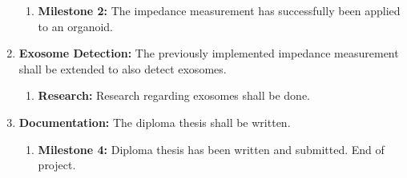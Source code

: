 \begin{enumerate}
\begin{enumerate}
        \item \textbf{Milestone 2:} The impedance measurement has successfully been applied to an organoid.
    \end{enumerate}
\item \textbf{Exosome Detection:} The previously implemented impedance measurement shall be extended to also detect exosomes.
    \begin{enumerate}
        \item \textbf{Research:} Research regarding exosomes shall be done.
    \end{enumerate}
\item \textbf{Documentation:} The diploma thesis shall be written.
    \begin{enumerate}
        \item \textbf{Milestone 4:} Diploma thesis has been written and submitted. End of project.
    \end{enumerate}
\end{enumerate}
 


 
 
 
 

